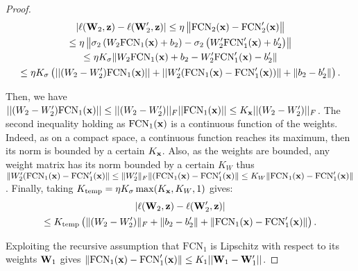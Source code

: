 \begin{noaddcontents}
\begin{proof}
        \begin{multline*}
            |\ell(\mathbf{W}_2, \mathbf{z}) - \ell(\mathbf{W}'_2, \mathbf{z}) |  \le \eta \left\|\text{FCN}_2(\mathbf{x})-\text{FCN}_2'(\mathbf{x}) \right\| \\
            \le \eta \left\|\sigma_2\left(W_2\text{FCN}_{1}(\mathbf{x}) +b_2 \right) - \sigma_2\left(W_2'\text{FCN}_{1}'(\mathbf{x}) +b_2' \right) \right\| \\
             \le \eta K_{\sigma}\| W_2\text{FCN}_{1}(\mathbf{x}) +b_2 - W_2'\text{FCN}_{1}'(\mathbf{x}) -b_2'\| \\
             \le \eta K_\sigma\left( ||(W_2- W_2') \text{FCN}_{1}(\mathbf{x}) || + ||W_2'(\text{FCN}_{1}(\mathbf{x})-\text{FCN}_{1}'(\mathbf{x}))\| + \|b_2-b_2'\|  \right).
        \end{multline*}
        
        Then, we have $||(W_2- W_2') \text{FCN}_{1}(\mathbf{x}) || \le ||(W_2- W_2')||_F ||\text{FCN}_1(\mathbf{x})|| \le  K_{\mathbf{x}} ||(W_2- W_2')||_F$. The second inequality holding as $\text{FCN}_1(\mathbf{x})$ is a continuous function of the weights. Indeed, as on a compact space, a continuous function reaches its maximum, then its norm is bounded by a certain $K_{\mathbf{x}}$. 
        Also, as the weights are bounded, any weight matrix has its norm bounded by a certain $K_{W}$ thus $\|W_2'(\text{FCN}_{1}(\mathbf{x})-\text{FCN}_{1}'(\mathbf{x})\| \le \|W_2'\|_F\|(\text{FCN}_{1}(\mathbf{x})-\text{FCN}_{1}'(\mathbf{x})\| \le K_{W}\|\text{FCN}_{1}(\mathbf{x})-\text{FCN}_{1}'(\mathbf{x})\|$. Finally, taking $K_{\text{temp}}= \eta K_{\sigma}\max(K_{\mathbf{x}},K_W,1)$ gives: 
        \begin{multline*}
            |\ell(\mathbf{W}_2, \mathbf{z}) - \ell(\mathbf{W}'_2, \mathbf{z}) |
            \\\le K_{\text{temp}} \left(\|(W_2- W_2')\|_F + \|b_2-b_2'\| + \|\text{FCN}_{1}(\mathbf{x})-\text{FCN}_{1}'(\mathbf{x})\|\right).
        \end{multline*}  
    
        Exploiting the recursive assumption that $\text{FCN}_1$ is Lipschitz with respect to its weights $\mathbf{W}_1$ gives  $\|\text{FCN}_{1}(\mathbf{x})-\text{FCN}_{1}'(\mathbf{x})\| \le K_1 ||\mathbf{W}_1- \mathbf{W}_1'|| $.
    

\end{proof}
\end{noaddcontents}
